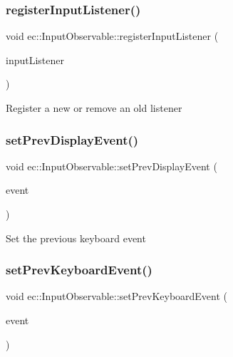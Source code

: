 \mbox{\label{classec_1_1_input_observable_a542bd14ecfbeceed917ea0df5c7f3755}} 
\subsubsection{\texorpdfstring{register\+Input\+Listener()}{registerInputListener()}}
{\footnotesize\ttfamily void ec\+::\+Input\+Observable\+::register\+Input\+Listener (\begin{DoxyParamCaption}\item[{\mbox{\hyperlink{classec_1_1_input_listener}{Input\+Listener}} $\ast$}]{input\+Listener }\end{DoxyParamCaption})\hspace{0.3cm}{\ttfamily [virtual]}}

Register a new or remove an old listener \mbox{\label{classec_1_1_input_observable_a55c7310a50dc873f69c2246bbeeed3e6}} 
\subsubsection{\texorpdfstring{set\+Prev\+Display\+Event()}{setPrevDisplayEvent()}}
{\footnotesize\ttfamily void ec\+::\+Input\+Observable\+::set\+Prev\+Display\+Event (\begin{DoxyParamCaption}\item[{const \mbox{\hyperlink{structec_1_1_display_event}{Display\+Event}} \&}]{event }\end{DoxyParamCaption})}

Set the previous keyboard event \mbox{\label{classec_1_1_input_observable_afcc8abf8d747417f50465189e632d0dd}} 
\subsubsection{\texorpdfstring{set\+Prev\+Keyboard\+Event()}{setPrevKeyboardEvent()}}
{\footnotesize\ttfamily void ec\+::\+Input\+Observable\+::set\+Prev\+Keyboard\+Event (\begin{DoxyParamCaption}\item[{const \mbox{\hyperlink{structec_1_1_keyboard_event}{Keyboard\+Event}} \&}]{event }\end{DoxyParamCaption})}


